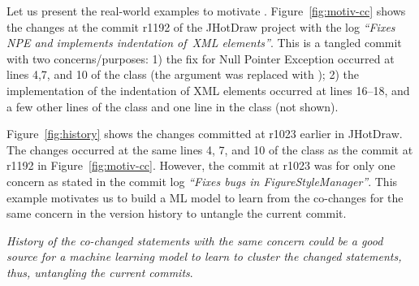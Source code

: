 Let us present the real-world examples to motivate {\tool}.
Figure~\ref{fig:motiv-cc} shows the changes at the commit
r1192 of the JHotDraw project with the log {\em ``Fixes NPE and
  implements indentation of~XML elements''}. This is a tangled commit
with two concerns/purposes: 1) the fix for Null Pointer Exception
occurred at lines 4,7, and 10 of the  class (the
 argument was replaced with
); 2) the implementation of the indentation
of XML elements occurred at lines 16--18, and a few other lines of the
 class and one line in the  class (not
shown).

Figure~\ref{fig:history} shows the changes committed at r1023 earlier
in JHotDraw. The changes occurred at the same lines 4, 7, and 10 of
the  class as the commit at r1192 in
Figure~\ref{fig:motiv-cc}. However, the commit at r1023 was for only
one concern as stated in the commit log {\em ``Fixes bugs in
  FigureStyleManager''}. This example motivates us to build a ML model
to learn from the co-changes for the same concern in the version
history to untangle the current commit.




\vspace{3pt}
 {\em
  History of the co-changed statements with the same concern could be
  a good source for a machine learning model to learn to cluster the
  changed statements, thus, untangling the current commits}.

